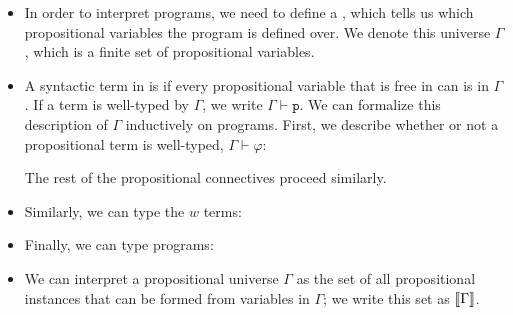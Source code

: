 \documentclass{tufte-handout}
\begin{document}
\begin{itemize}

  \item In order to interpret programs, we need to define a , which tells us which propositional variables the program is defined
  over. We denote this universe $\Gamma$, which is a finite set of propositional
  variables.

  \item A syntactic term in \prop{} is  if every
  propositional variable that is free in \prop{} can is in $\Gamma$. If a term
  is well-typed by $\Gamma$, we write $\Gamma \vdash \texttt{p}$. We can
  formalize this description of $\Gamma$ inductively on \prop{} programs. First,
  we describe whether or not a propositional term is well-typed, $\Gamma \vdash
  \varphi$:
  The rest of the propositional connectives proceed similarly.

  \item Similarly, we can type the $w$ terms:
 
  \item Finally, we can type programs:
  \begin{mathpar}
  \end{mathpar}

  \item We can interpret a propositional universe $\Gamma$ as the set of all
  propositional instances that can be formed from variables in $\Gamma$; we 
  write this set as $\dbracket{\Gamma}$.
  
\end{itemize}
\end{document}
